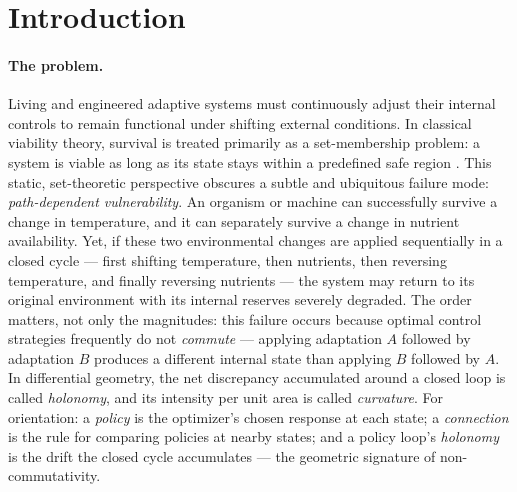 \documentclass[11pt,a4paper]{article}
\theoremstyle{plain}
\theoremstyle{definition}
\theoremstyle{remark}
\begin{document}
\tableofcontents
\newpage

\section{Introduction}\label{sec:role}

\paragraph{The problem.}
Living and engineered adaptive systems must continuously adjust
their internal controls to remain functional under shifting
external conditions. In classical viability theory, survival is
treated primarily as a set-membership problem: a system is viable
as long as its state stays within a predefined safe region
\citep{aubin2011}. This static, set-theoretic perspective obscures
a subtle and ubiquitous failure mode: \emph{path-dependent
vulnerability}. An organism or machine can successfully survive a
change in temperature, and it can separately survive a change in
nutrient availability. Yet, if these two environmental changes are
applied sequentially in a closed cycle --- first shifting
temperature, then nutrients, then reversing temperature, and
finally reversing nutrients --- the system may return to its
original environment with its internal reserves severely degraded.
The order matters, not only the magnitudes: this failure occurs
because optimal control strategies frequently do not
\emph{commute} --- applying adaptation $A$ followed by adaptation
$B$ produces a different internal state than applying $B$ followed
by $A$. In differential geometry, the net discrepancy accumulated
around a closed loop is called \emph{holonomy}, and its intensity
per unit area is called \emph{curvature}. For orientation: a
\emph{policy} is the optimizer's chosen response at each state; a
\emph{connection} is the rule for comparing policies at nearby
states; and a policy loop's \emph{holonomy} is the drift the closed
cycle accumulates --- the geometric signature of
non-commutativity.
\end{document}

